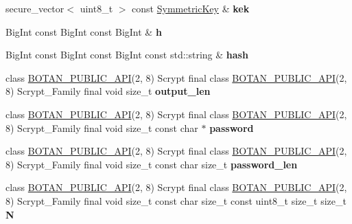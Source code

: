 \begin{DoxyCompactItemize}
secure\+\_\+vector$<$ uint8\+\_\+t $>$ const \hyperlink{namespace_botan_a89cf6c3513428f524454d01830221a88}{Symmetric\+Key} \& {\bfseries kek}
\item 
\mbox{\label{namespace_botan_a1e123345edc35de68c76c9b16a3d7a12}} 
Big\+Int const Big\+Int const Big\+Int \& {\bfseries h}
\item 
\mbox{\label{namespace_botan_a973b2202e0dd6c52c22181e5129cc89e}} 
Big\+Int const Big\+Int const Big\+Int const std\+::string \& {\bfseries hash}
\item 
\mbox{\label{namespace_botan_a1496c41c0690b2f80cbc40ec932f1dfd}} 
class \hyperlink{namespace_botan_a6b9388030d872e586a4655b776ac9501}{B\+O\+T\+A\+N\+\_\+\+P\+U\+B\+L\+I\+C\+\_\+\+A\+PI}(2, 8) Scrypt final class \hyperlink{namespace_botan_a6b9388030d872e586a4655b776ac9501}{B\+O\+T\+A\+N\+\_\+\+P\+U\+B\+L\+I\+C\+\_\+\+A\+PI}(2, 8) Scrypt\+\_\+\+Family final void size\+\_\+t {\bfseries output\+\_\+len}
\item 
\mbox{\label{namespace_botan_ad48d48a7011391b581409ad87778645b}} 
class \hyperlink{namespace_botan_a6b9388030d872e586a4655b776ac9501}{B\+O\+T\+A\+N\+\_\+\+P\+U\+B\+L\+I\+C\+\_\+\+A\+PI}(2, 8) Scrypt final class \hyperlink{namespace_botan_a6b9388030d872e586a4655b776ac9501}{B\+O\+T\+A\+N\+\_\+\+P\+U\+B\+L\+I\+C\+\_\+\+A\+PI}(2, 8) Scrypt\+\_\+\+Family final void size\+\_\+t const char $\ast$ {\bfseries password}
\item 
\mbox{\label{namespace_botan_a4068737a9a762f88081e29a17c4de95c}} 
class \hyperlink{namespace_botan_a6b9388030d872e586a4655b776ac9501}{B\+O\+T\+A\+N\+\_\+\+P\+U\+B\+L\+I\+C\+\_\+\+A\+PI}(2, 8) Scrypt final class \hyperlink{namespace_botan_a6b9388030d872e586a4655b776ac9501}{B\+O\+T\+A\+N\+\_\+\+P\+U\+B\+L\+I\+C\+\_\+\+A\+PI}(2, 8) Scrypt\+\_\+\+Family final void size\+\_\+t const char size\+\_\+t {\bfseries password\+\_\+len}
\item 
\mbox{\label{namespace_botan_a53668c1d1ed988ada4e718cf08a19b78}} 
class \hyperlink{namespace_botan_a6b9388030d872e586a4655b776ac9501}{B\+O\+T\+A\+N\+\_\+\+P\+U\+B\+L\+I\+C\+\_\+\+A\+PI}(2, 8) Scrypt final class \hyperlink{namespace_botan_a6b9388030d872e586a4655b776ac9501}{B\+O\+T\+A\+N\+\_\+\+P\+U\+B\+L\+I\+C\+\_\+\+A\+PI}(2, 8) Scrypt\+\_\+\+Family final void size\+\_\+t const char size\+\_\+t const uint8\+\_\+t size\+\_\+t size\+\_\+t {\bfseries N}

\end{DoxyCompactItemize}
